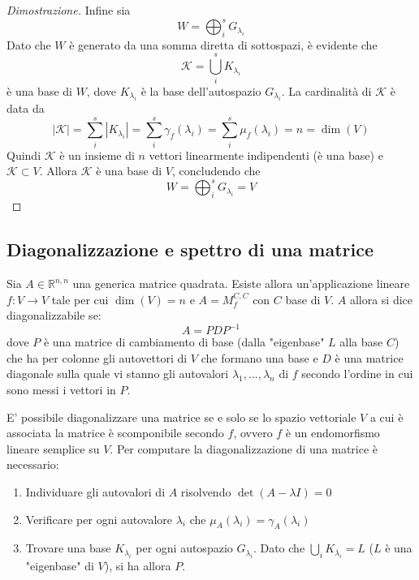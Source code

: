 \documentclass{article}
\begin{document}
\begin{proof}[Dimostrazione]
        \vspace{5pt}
        Infine sia
        \[
            W = \bigoplus_{i}^{s} G_{\lambda_i}
        \]
        Dato che $W$ è generato da una somma diretta di sottospazi, è evidente che 
        \[
            \mathcal{K} = \bigcup_{i}^{s} K_{\lambda_i}
        \]
        è una base di $W$, dove $K_{\lambda_i}$ è la base dell'autospazio $G_{\lambda_i}$. La cardinalità di $\mathcal{K}$ è data da 
        \[
            |\mathcal{K}| = \sum_{i}^{s} |K_{\lambda_i}| = \sum_{i}^{s} \gamma_{f}(\lambda_i) = \sum_{i}^{s} \mu_{f}(\lambda_i) = n = \dim(V)
        \]
        Quindi $\mathcal{K}$ è un insieme di $n$ vettori linearmente indipendenti (è una base) e $\mathcal{K} \subset V$. Allora $\mathcal{K}$ è una base di $V$, concludendo che
        \[
            W = \bigoplus_{i}^{s} G_{\lambda_i} = V
        \]
        
    \end{proof}




\vspace{10pt}    
\subsection{Diagonalizzazione e spettro di una matrice}
    Sia $A \in \mathbb{R}^{n, n}$ una generica matrice quadrata. Esiste allora un'applicazione lineare $f: V \rightarrow V$ tale per cui $\dim(V) = n$ e $A = M_{f}^{C, C}$ con $C$ base di $V$. $A$ allora si dice diagonalizzabile se:
    \[
        A = PDP^{-1}
    \]
    dove $P$ è una matrice di cambiamento di base (dalla "eigenbase" $L$ alla base $C$) che ha per colonne gli autovettori di $V$ che formano una base e $D$ è una matrice diagonale sulla quale vi stanno gli autovalori $\lambda_1, ..., \lambda_n$ di $f$
    secondo l'ordine in cui sono messi i vettori in $P$.

    \vspace{10pt}
    E' possibile diagonalizzare una matrice se e solo se lo spazio vettoriale $V$ a cui è associata la matrice è scomponibile secondo $f$, ovvero $f$ è un endomorfismo lineare semplice su $V$.
    Per computare la diagonalizzazione di una matrice è necessario:
    \begin{enumerate}[label=(\arabic*)]
        \item Individuare gli autovalori di $A$ risolvendo $\det(A - \lambda I) = 0$
        \item Verificare per ogni autovalore $\lambda_i$ che $\mu_{A}(\lambda_i) = \gamma_{A}(\lambda_i)$
        \item Trovare una base $K_{\lambda_i}$ per ogni autospazio $G_{\lambda_i}$. Dato che $\displaystyle \bigcup_{i} K_{\lambda_i} = L$ ($L$ è una "eigenbase" di $V$), si ha allora $P$.
    \end{enumerate}
\end{document}
